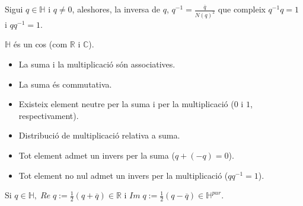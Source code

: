 \documentclass[a4paper,12pt]{article}
\begin{document}
	\begin{definicio}
		Sigui $q \in \mathbb{H}$ i $q \neq 0$, aleshores, la inversa de $q$, $q^{-1} = \frac{\overline{q}}{N(q)^2}$ que compleix $q^{-1}q = 1$ i $qq^{-1} = 1$.
	\end{definicio}
	\begin{teorema}
	    $\mathbb{H}$ és un cos (com $\mathbb{R}\text{ i }\mathbb{C}$).
	\end{teorema}
	\begin{demostracio}
	\begin{itemize}
			\item La suma i la multiplicació són associatives.
			\item La suma és commutativa.
			\item Existeix element neutre per la suma i per la multiplicació ($0$ i $1$, respectivament).
			\item Distribució de multiplicació relativa a suma.
			\item Tot element admet un invers per la suma ($q+(-q) = 0$).
			\item Tot element no nul admet un invers per la multiplicació ($qq^{-1} = 1$).
		\end{itemize}
	\end{demostracio}
	\begin{notacio}
		Si $q \in \mathbb{H},\;Re\;q := \frac{1}{2}\left(q + \overline{q}\right) \in \mathbb{R}$ i $Im\;q := \frac{1}{2}\left(q - \overline{q}\right) \in \mathbb{H}^{pur}$.\\
	\end{notacio}
\end{document}
